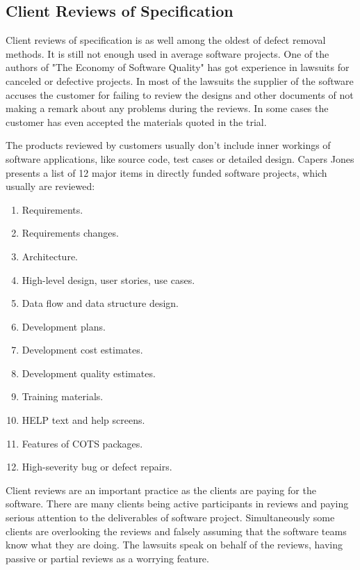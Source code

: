 \subsection{Client Reviews of Specification} 
\label{subsec:clientreview}

Client reviews of specification is as well among the oldest of defect removal methods. It is still not enough used in average software projects. One of the authors of "The Economy of Software Quality" has got experience in lawsuits for canceled or defective projects. In most of the lawsuits the supplier of the software accuses the customer for failing to review the designs and other documents of not making a remark about any problems during the reviews. In some cases the customer has even accepted the materials quoted in the trial.

The products reviewed by customers usually don't include inner workings of software applications, like source code, test cases or detailed design. Capers Jones presents a list of 12 major items in directly funded software projects, which usually are reviewed:


\begin{enumerate}
	\item Requirements.
	\item Requirements changes.
	\item Architecture.
	\item High-level design, user stories, use cases.
	\item Data flow and data structure design.
	\item Development plans.
	\item Development cost estimates.
	\item Development quality estimates.
	\item Training materials.
	\item HELP text and help screens.
	\item Features of COTS packages.
	\item High-severity bug or defect repairs.
\end{enumerate}

Client reviews are an important practice as the clients are paying for the software. There are many clients being active participants in reviews and paying serious attention to the deliverables of software project. Simultaneously some clients are overlooking the reviews and falsely assuming that the software teams know what they are doing. The lawsuits speak on behalf of the reviews, having passive or partial reviews as a worrying feature.

